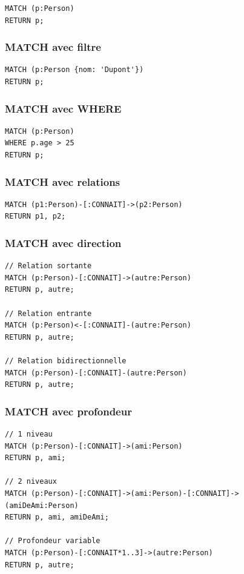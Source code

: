 \documentclass[11pt,a4paper]{article}
\begin{document}
\begin{lstlisting}
MATCH (p:Person)
RETURN p;
\end{lstlisting}

\subsubsection{MATCH avec filtre}

\begin{lstlisting}
MATCH (p:Person {nom: 'Dupont'})
RETURN p;
\end{lstlisting}

\subsubsection{MATCH avec WHERE}

\begin{lstlisting}
MATCH (p:Person)
WHERE p.age > 25
RETURN p;
\end{lstlisting}

\subsubsection{MATCH avec relations}

\begin{lstlisting}
MATCH (p1:Person)-[:CONNAIT]->(p2:Person)
RETURN p1, p2;
\end{lstlisting}

\subsubsection{MATCH avec direction}

\begin{lstlisting}
// Relation sortante
MATCH (p:Person)-[:CONNAIT]->(autre:Person)
RETURN p, autre;

// Relation entrante
MATCH (p:Person)<-[:CONNAIT]-(autre:Person)
RETURN p, autre;

// Relation bidirectionnelle
MATCH (p:Person)-[:CONNAIT]-(autre:Person)
RETURN p, autre;
\end{lstlisting}

\subsubsection{MATCH avec profondeur}

\begin{lstlisting}
// 1 niveau
MATCH (p:Person)-[:CONNAIT]->(ami:Person)
RETURN p, ami;

// 2 niveaux
MATCH (p:Person)-[:CONNAIT]->(ami:Person)-[:CONNAIT]->(amiDeAmi:Person)
RETURN p, ami, amiDeAmi;

// Profondeur variable
MATCH (p:Person)-[:CONNAIT*1..3]->(autre:Person)
RETURN p, autre;
\end{lstlisting}
\end{document}
